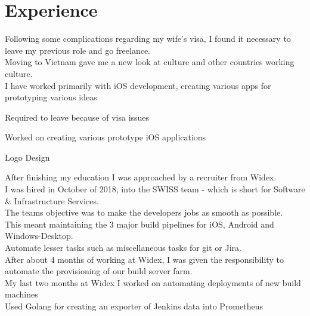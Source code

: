 \documentclass[]{cv}
\begin{document}
\begin{minipage}[t]{0.66\textwidth} 

\section{Experience}

\descript{}

Following some complications regarding my wife’s visa, I found it necessary to leave my previous role and go freelance. \\
Moving to Vietnam gave me a new look at culture and other countries working culture. \\
I have worked primarily with iOS development, creating various apps for prototyping various ideas \\

\vspace{\topsep} %
\begin{tightemize}
	\item Required to leave because of visa issues
	\item Worked on creating various prototype iOS applications
	\item Logo Design
\end{tightemize}
\sectionsep


After finishing my education I was approached by a recruiter from Widex. \\
I was hired in October of 2018, into the SWISS team - which is short for Software \& Infrastructure Services. \\
The teams objective was to make the developers jobs as smooth as possible. \\
This meant maintaining the 3 major build pipelines for iOS, Android and Windows-Desktop. \\
Automate lesser tasks such as miscellaneous tasks for git or Jira. \\
After about 4 months of working at Widex, I was given the responsibility to automate the provisioning of our build server farm. \\
My last two months at Widex I worked on automating deployments of new build machines \\
Used Golang for creating an exporter of Jenkins data into Prometheus


\end{minipage}
\end{document}
